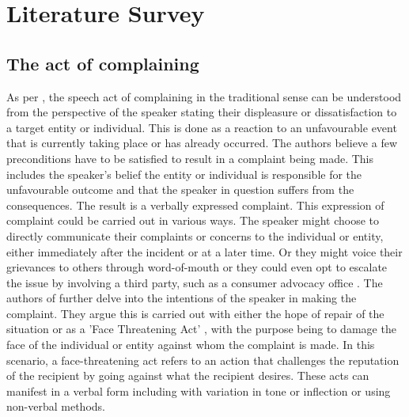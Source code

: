 \chapter{Literature Survey}

\section{The act of complaining}

As per \cite{olshtain_speechact_1987}, the speech act of complaining in the traditional sense can be understood from the perspective of the speaker stating their displeasure or dissatisfaction to a target entity or individual. This is done as a reaction to an unfavourable event that is currently taking place or has already occurred. The authors believe a few preconditions have to be satisfied to result in a complaint being made. This includes the speaker's belief the entity or individual is responsible for the unfavourable outcome and that the speaker in question suffers from the consequences. The result is a verbally expressed complaint.
\newline \newline
This expression of complaint could be carried out in various ways. The speaker might choose to directly communicate their complaints or concerns to the individual or entity, either immediately after the incident or at a later time. Or they might voice their grievances to others through word-of-mouth or they could even opt to escalate the issue by involving a third party, such as a consumer advocacy office \cite{sparksComplainingCyberspaceMotives2010}.
\newline\newline
The authors of \cite{olshtain_speechact_1987} further delve into the intentions of the speaker in making the complaint. They argue this is carried out with either the hope of repair of the situation or as a 'Face Threatening Act' \cite{brownPolitenessUniversalsLanguage1987}, with the purpose being to damage the face of the individual or entity against whom the complaint is made. In this scenario, a face-threatening act refers to an action that challenges the reputation of the recipient by going against what the recipient desires. These acts can manifest in a verbal form including with variation in tone or inflection or using non-verbal methods.
\newline \newline
